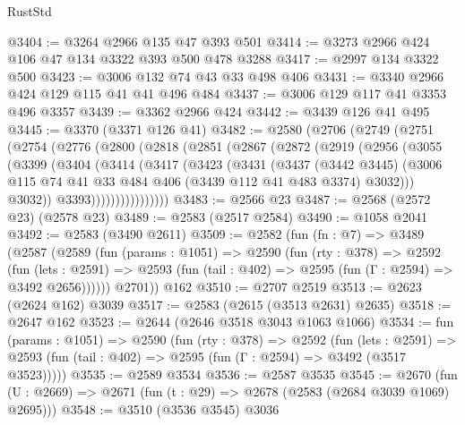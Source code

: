 \begin{lexlean}{RustStd}
\begin{coremodule}
@3404 := @3264 @2966 @135 @47 @393 @501
@3414 := @3273 @2966 @424 @106 @47 @134 @3322 @393 @500 @478 @3288
@3417 := @2997 @134 @3322 @500
@3423 := @3006 @132 @74 @43 @33 @498 @406
@3431 := @3340 @2966 @424 @129 @115 @41 @41 @496 @484
@3437 := @3006 @129 @117 @41 @3353 @496 @3357
@3439 := @3362 @2966 @424
@3442 := @3439 @126 @41 @495
@3445 := @3370 (@3371 @126 @41)
@3482 := @2580
    (@2706
      (@2749
        (@2751
          (@2754
            (@2776
              (@2800
                (@2818
                  (@2851
                    (@2867
                      (@2872
                        (@2919
                          (@2956
                            (@3055
                              (@3399
                                (@3404
                                  (@3414
                                    (@3417
                                      (@3423
                                        (@3431
                                          (@3437
                                            (@3442 @3445)
                                            (@3006
                                              @115
                                              @74
                                              @41
                                              @33
                                              @484
                                              @406
                                              (@3439 @112 @41 @483 @3374)
                                              @3032)))
                                        @3032))
                                    @3393))))))))))))))))
@3483 := @2566 @23
@3487 := @2568 (@2572 @23) (@2578 @23)
@3489 := @2583 (@2517 @2584)
@3490 := @1058 @2041
@3492 := @2583 (@3490 @2611)
@3509 := @2582
    (fun (fn : @7) =>
    @3489
      (@2587
        (@2589
          (fun (params : @1051) =>
          @2590
            (fun (rty : @378) =>
            @2592
              (fun (lets : @2591) =>
              @2593 (fun (tail : @402) => @2595 (fun (Γ : @2594) => @3492 @2656))))))
        @2701))
    @162
@3510 := @2707 @2519
@3513 := @2623 (@2624 @162) @3039
@3517 := @2583 (@2615 (@3513 @2631) @2635)
@3518 := @2647 @162
@3523 := @2644 (@2646 @3518 @3043 @1063 @1066)
@3534 := fun (params : @1051) =>
  @2590
    (fun (rty : @378) =>
    @2592
      (fun (lets : @2591) =>
      @2593 (fun (tail : @402) => @2595 (fun (Γ : @2594) => @3492 (@3517 @3523)))))
@3535 := @2589 @3534
@3536 := @2587 @3535
@3545 := @2670 (fun (U : @2669) => @2671 (fun (t : @29) => @2678 (@2583 (@2684 @3039 @1069) @2695)))
@3548 := @3510 (@3536 @3545) @3036

\end{coremodule}
\end{lexlean}
